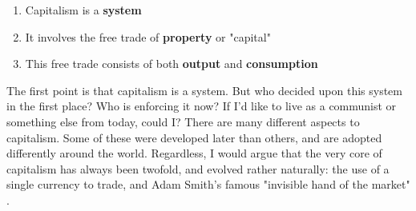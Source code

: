 \documentclass[12pt]{memoir}
\begin{document}
				\begin{enumerate}
					\item Capitalism is a \textbf{system}
					\item It involves the free trade of \textbf{property} or "capital"
					\item This free trade consists of both \textbf{output} and \textbf{consumption}
				\end{enumerate}
			
			The first point is that capitalism is a system. But who decided upon this system in the first place? Who is enforcing it now? If I'd like to live as a communist or something 
			else from today, could I? There are many different aspects to capitalism. Some of these were developed later than others, and are adopted differently around 
			the world. Regardless, I would argue that the very core of capitalism has always been twofold, and evolved rather naturally: the use of a single currency to trade, and Adam Smith's famous 
			"invisible hand of the market" \cite{Smith1776}.\
			
\end{document}
